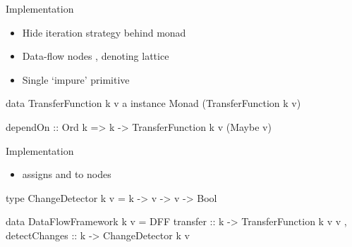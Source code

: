 \documentclass{haskellbeamer}
\begin{document}
\begin{frame}[fragile]{Implementation}
  \begin{itemize}
    \item Hide iteration strategy behind  monad
    \item Data-flow nodes , denoting lattice 
    \item Single `impure' primitive 
  \end{itemize}
  \begin{center}
    \begin{minipage}{0.9\textwidth}
      \begin{haskell}
        data TransferFunction k v a
        instance Monad (TransferFunction k v)

        dependOn
          :: Ord k
          => k
          -> TransferFunction k v (Maybe v)
      \end{haskell}
    \end{minipage}
  \end{center}
\end{frame}

\begin{frame}[fragile]{Implementation}
  \begin{itemize}
    \item {} assigns  and  to nodes
  \end{itemize}
  \begin{center}
    \begin{minipage}{0.9\textwidth}
      \begin{haskell}
        type ChangeDetector k v
          = k -> v -> v -> Bool

        data DataFlowFramework k v 
          = DFF 
          { transfer      :: k -> TransferFunction k v v
          , detectChanges :: k -> ChangeDetector k v
          }
      \end{haskell}
    \end{minipage}
  \end{center}
\end{frame}
\end{document}
